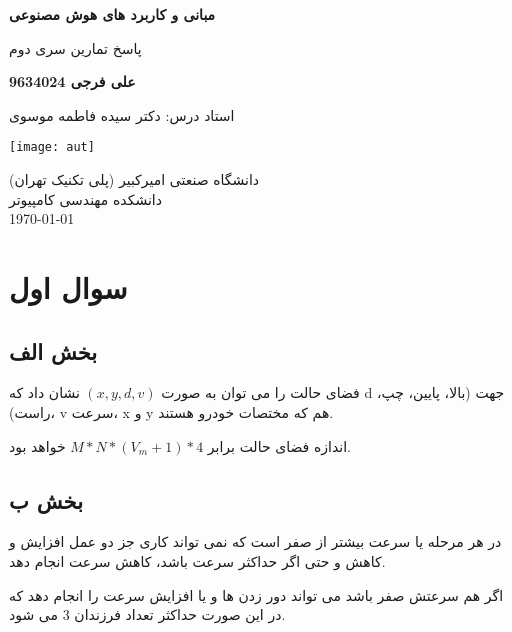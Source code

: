 \documentclass[paper=a4, fontsize=11pt]{article}
\begin{document}
\thispagestyle{empty}
	\begin{titlepage}
		\begin{center}
		
       \vspace*{1cm}
       
       \textbf{مبانی و کاربرد های هوش مصنوعی}

       \vspace{0.5cm}
       
پاسخ تمارین سری دوم
       \vspace{2cm}
       

	\textbf{علی فرجی 9634024}
       
       \vspace{2cm}
       
استاد درس: دکتر سیده فاطمه موسوی
 \vfill

     \texttt{[image: aut]}
 
دانشگاه صنعتی امیرکبیر (پلی تکنیک تهران) \\
دانشکده مهندسی کامپیوتر\\
\today

   \end{center}
\end{titlepage}

\tableofcontents
\thispagestyle{empty}

\newpage

\setcounter{page}{1}

\section{سوال اول}
\subsection{بخش الف}
فضای حالت را می توان به صورت
$(x,y,d,v)$
نشان داد که d جهت (بالا، پایین، چپ، راست)، v سرعت، x و y هم که مختصات خودرو هستند.

اندازه فضای حالت برابر $ M * N * (V_m + 1) * 4 $ خواهد بود.

\subsection{بخش ب}
در هر مرحله یا سرعت بیشتر از صفر است که نمی تواند کاری جز دو عمل افزایش و کاهش و حتی اگر حداکثر سرعت باشد، کاهش سرعت انجام دهد.

اگر هم سرعتش صفر باشد می تواند دور زدن ها و یا افزایش سرعت را انجام دهد که در این صورت حداکثر تعداد فرزندان 3 می شود.
\end{document}
